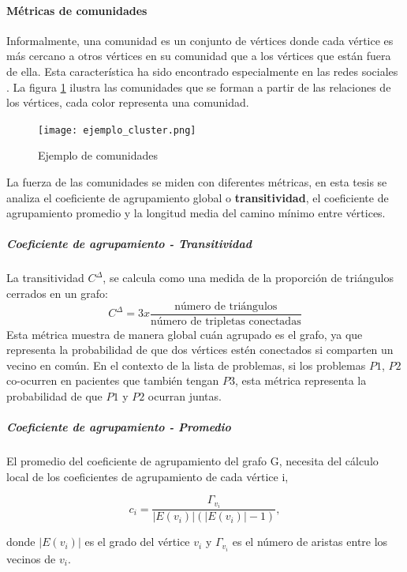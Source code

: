 \paragraph{Métricas de comunidades}
\label{par:efecto-comunidades}
Informalmente, una comunidad es un conjunto de vértices donde cada vértice es más cercano a otros vértices en su comunidad que a los vértices que están fuera de ella. Esta característica ha sido encontrado especialmente en las redes sociales \cite{Tang2010}. La figura \ref{fig:ejemploCluster} ilustra las comunidades que se forman a partir de las relaciones de los vértices, cada color representa una comunidad.

\begin{figure}
\caption{Ejemplo de comunidades}
\label{fig:ejemploCluster}
\centering
\texttt{[image: ejemplo\_cluster.png]}
\end{figure}

La fuerza de las comunidades se miden con diferentes métricas, en esta tesis se analiza el coeficiente de agrupamiento global o \textbf{transitividad}, el coeficiente de agrupamiento promedio y la longitud media del camino mínimo entre vértices. 

\subparagraph{Coeficiente de agrupamiento - Transitividad}
La transitividad \cite{Wasserman1994} $C^{\Delta}$, se calcula como una medida de la proporción de triángulos cerrados en un grafo:
\begin{equation}
\label{equ:coeficiente_transitividad}
C^{\Delta} =3x\frac{\text{número de triángulos}}{\text{número de tripletas conectadas}}
\end{equation}
Esta métrica muestra de manera global cuán agrupado es el grafo, ya que representa la probabilidad de que dos vértices estén conectados si comparten un vecino en común. En el contexto de la lista de problemas, si los problemas $P1$, $P2$ co-ocurren en pacientes que también tengan $P3$, esta métrica representa la probabilidad de que $P1$ y $P2$ ocurran juntas.

\subparagraph{Coeficiente de agrupamiento - Promedio}\cite{Saramaki2006,Kaiser2008}
El promedio del coeficiente de agrupamiento del grafo G, necesita del cálculo local de los coeficientes de agrupamiento de cada vértice i,

\begin{equation}
c_{i} = \frac{\Gamma_{v_{i}}}{|E(v_{i})|(|E(v_{i})|-1)},
\end{equation}

donde $|E(v_{i})|$ es el grado del vértice $v_{i}$ y $\Gamma_{v_{i}}$ es el número de aristas entre los vecinos de $v_{i}$.

